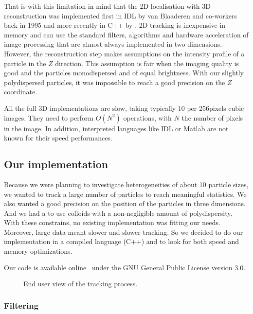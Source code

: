 That is with this limitation in mind that the 2D localisation with 3D reconstruction was implemented first in IDL by van Blaaderen and co-workers~\citep{vanBlaaderen1997} back in 1995 and more recently in C++ by \citet{Lu2007}. 2D tracking is inexpensive in memory and can use the standard filters, algorithms and hardware acceleration of image processing that are almost always implemented in two dimensions. However, the reconstruction step makes assumptions on the intensity profile of a particle in the $Z$ direction. This assumption is fair when the imaging quality is good and the particles monodispersed and of equal brightness. With our slightly polydispersed particles, it was impossible to reach a good precision on the $Z$ coordinate.

All the full 3D implementations are slow, taking typically \unit{10}{\minute} per \unit{256}{pixels} cubic images. They need to perform $O(N^2)$ operations, with $N$ the number of pixels in the image. In addition, interpreted languages like IDL or Matlab are not known for their speed performances.

\subsection{Our implementation}

Because we were planning to investigate heterogeneities of about 10 particle sizes, we wanted to track a large number of particles to reach meaningful statistics. We also wanted a good precision on the position of the particles in three dimensions. And we had a to use colloids with a non-negligible amount of polydispersity. With these constrains, no existing implementation was fitting our needs. Moreover, large data meant slower and slower tracking. So we decided to do our implementation in a compiled language (C++) and to look for both speed and memory optimizations.

Our code is available online~\citep{LeocmachColloids} under the GNU General Public License version 3.0.
\begin{figure}
	\centering
	
	\caption{End user view of the tracking process.}
	\label{fig:tracking_process}
\end{figure}


\subsubsection{Filtering}

